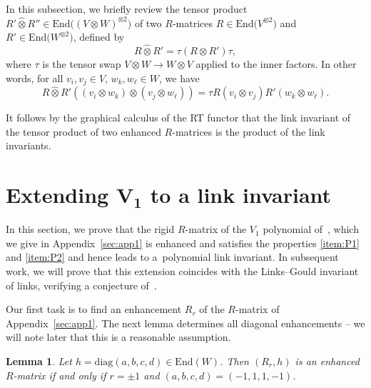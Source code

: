 \documentclass[pdftex]{sigma}
\numberwithin{equation}{section}
\newtheorem{Lemma}[Theorem]{Lemma}
\theoremstyle{definition}
\begin{document}
In this subsection, we briefly review the tensor product $R' \widehat{\otimes} R''\in
\mathrm{End}\bigl((V\otimes W)^{\otimes 2}\bigr)$ of two $R$-matrices $R \in \mathrm{End}\bigl(V^{\otimes 2}\bigr)$
and $R' \in \mathrm{End}\bigl(W^{\otimes 2}\bigr)$, defined by
\begin{equation*}%
R \widehat{\otimes} R' = \tau (R \otimes R') \tau,
\end{equation*}
where $\tau$ is the tensor swap $V\otimes W\to W\otimes V$ applied to the inner
factors. In other words, for all $v_i,v_j \in V$, $w_k, w_\ell \in W$, we have
\begin{equation*}
R \widehat{\otimes} R'((v_i \otimes w_k) \otimes (v_j \otimes w_\ell))=
\tau R(v_i \otimes v_j) R'(w_k \otimes w_\ell) .
\end{equation*}

It follows by the graphical calculus of the RT functor that the link invariant
of the tensor product of two enhanced $R$-matrices is the product of the
link invariants.

\section[Extending V\_1 to a link invariant]{Extending $\boldsymbol{V_1}$ to a link invariant}
\label{sec:V1}

In this section, we prove that the rigid $R$-matrix of the $V_1$ polynomial
of~\cite{GK:multi}, which we give in Appendix~\ref{sec:app1} is enhanced
and satisfies the properties \eqref{item:P1} and \eqref{item:P2} and hence leads
to a~polynomial link invariant.
In subsequent work, we will prove that this extension coincides with the
Links--Gould invariant of links, verifying a conjecture of~\cite{GK:multi}.

Our first task is to find an enhancement $R_{r}$ of the $R$-matrix
of Appendix~\ref{sec:app1}. The next lemma determines all diagonal enhancements
-- we will note later that this is a reasonable assumption.

\begin{Lemma}
\label{lem.V10}
Let $h=\mathrm{diag}(a,b,c,d) \in \mathrm{End}(W)$. Then $(R_{r},h)$ is an enhanced $R$-matrix
if and only if $r = \pm 1$ and $(a,b,c,d) = (-1, 1, 1, -1)$.
\end{Lemma}
\end{document}
